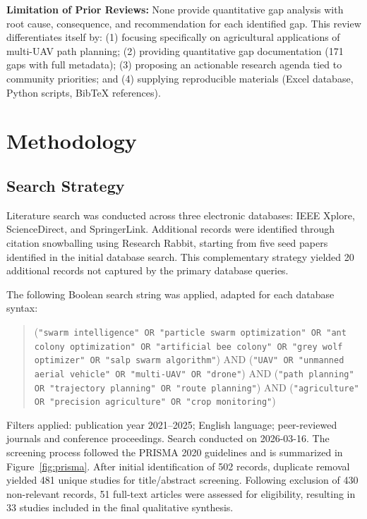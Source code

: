 \documentclass[review,3p,times]{elsarticle}
\begin{document}
\textbf{Limitation of Prior Reviews:} None provide quantitative gap analysis with root cause, consequence, and recommendation for each identified gap. This review differentiates itself by: (1) focusing specifically on agricultural applications of multi-UAV path planning; (2) providing quantitative gap documentation (171 gaps with full metadata); (3) proposing an actionable research agenda tied to community priorities; and (4) supplying reproducible materials (Excel database, Python scripts, BibTeX references).

\section{Methodology}

\subsection{Search Strategy}
Literature search was conducted across three electronic databases: IEEE Xplore, ScienceDirect, and SpringerLink. Additional records were identified through citation snowballing using Research Rabbit, starting from five seed papers identified in the initial database search. This complementary strategy yielded 20 additional records not captured by the primary database queries.

The following Boolean search string was applied, adapted for each database syntax:
\begin{quote}
(\texttt{"swarm intelligence" OR "particle swarm optimization" OR "ant colony optimization" OR "artificial bee colony" OR "grey wolf optimizer" OR "salp swarm algorithm"}) AND (\texttt{"UAV" OR "unmanned aerial vehicle" OR "multi-UAV" OR "drone"}) AND (\texttt{"path planning" OR "trajectory planning" OR "route planning"}) AND (\texttt{"agriculture" OR "precision agriculture" OR "crop monitoring"})
\end{quote}

Filters applied: publication year 2021--2025; English language; peer-reviewed journals and conference proceedings. Search conducted on 2026-03-16. The screening process followed the PRISMA 2020 guidelines \cite{page2021} and is summarized in Figure~\ref{fig:prisma}. After initial identification of 502 records, duplicate removal yielded 481 unique studies for title/abstract screening. Following exclusion of 430 non-relevant records, 51 full-text articles were assessed for eligibility, resulting in 33 studies included in the final qualitative synthesis.
\end{document}
